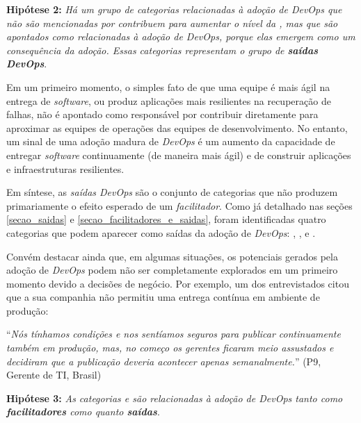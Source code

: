 \begin{mh}
\textbf{Hipótese 2:} {\it Há um grupo de categorias relacionadas à adoção de
DevOps que não são mencionadas por contribuem para aumentar o nível da \cc, mas
que são apontados como relacionadas à adoção de DevOps, porque elas emergem
como um consequência da adoção. Essas categorias representam o grupo de
{\bf \emph{saídas DevOps}}}.
\end{mh}

Em um primeiro momento, o simples fato de que uma equipe é mais ágil na entrega
de {\it software}, ou produz aplicações mais resilientes na recuperação de
falhas, não é apontado como responsável por contribuir diretamente para
aproximar as equipes de operações das equipes de desenvolvimento. No entanto,
um sinal de uma adoção madura de {\it DevOps} é um aumento da capacidade de
entregar {\it software} continuamente (de maneira mais ágil) e de construir
aplicações e infraestruturas resilientes.

Em síntese, as \emph{saídas DevOps} são o conjunto de categorias que não
produzem primariamente o efeito esperado de um \emph{facilitador}. Como já
detalhado nas seções \ref{secao_saidas} e \ref{secao_facilitadores_e_saidas},
foram identificadas quatro categorias que podem aparecer como saídas da adoção
de {\it DevOps}: , , 
e .

Convém destacar ainda que, em algumas situações, os potenciais gerados pela
adoção de {\it DevOps} podem não ser completamente explorados em um primeiro
momento devido a decisões de negócio. Por exemplo, um dos entrevistados citou
que a sua companhia não permitiu uma entrega contínua em ambiente de produção:

\begin{mq}
``\emph{Nós tínhamos condições e nos sentíamos seguros para publicar
continuamente também em produção, mas, no começo os gerentes ficaram meio
assustados e decidiram que a publicação deveria acontecer apenas semanalmente.}''
(P9, Gerente de TI, Brasil)
\end{mq}

\begin{mh}
\textbf{Hipótese 3:} {\it As categorias  e  são relacionadas à adoção de DevOps tanto como {\bf \emph{facilitadores}}
como quanto {\bf \emph{saídas}}}.
\end{mh}

